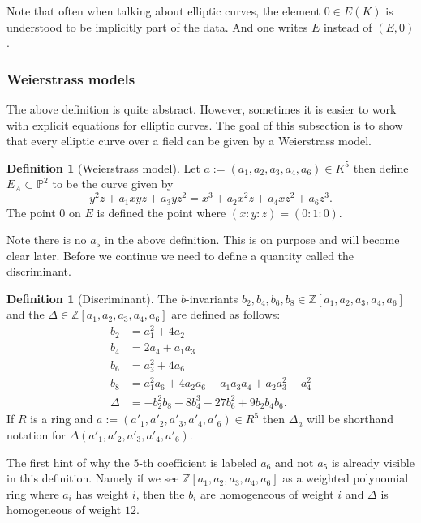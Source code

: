 \documentclass[a4paper,12pt,reqno]{amsart}
\newcommand{\field}[1]{\mathbb{#1}}  %
\newcommand{\Z}{\field{Z}} %
\renewcommand{\P}{\field{P}}
\theoremstyle{definition}
\newtheorem{definition}[lemma]{Definition}
\numberwithin{lemma}{section}
\numberwithin{equation}{section}
\numberwithin{figure}{section}
\begin{document}
Note that often when talking about elliptic curves, the element $0 \in E(K)$ is understood to be implicitly part of the data. And one writes $E$ instead of $(E,0)$.

\subsubsection{Weierstrass models}\label{sec:weierstrass-over-K}
The above definition is quite abstract. However, sometimes it is easier to work with explicit equations for elliptic curves. The goal of this subsection is to show that every elliptic curve over a field can be given by a Weierstrass model.

\begin{definition}[Weierstrass model]\label{def:weierstrass-model-over-K}
Let $a := (a_1,a_2,a_3,a_4,a_6) \in K^5$ then define $E_{A} \subset \P^2$ to be the curve given by
$$y^2z+ a_1xyz+a_3yz^2=x^3+a_2x^2z+a_4xz^2+a_6z^3.$$
The point $0$ on $E$ is defined the point where $(x:y:z) = (0:1:0)$.
\end{definition}



Note there is no $a_5$ in the above definition. This is on purpose and will become clear later.
Before we continue we need to define a quantity called the discriminant.
\begin{definition}[Discriminant]
The $b$-invariants $b_2,b_4,b_6,b_8 \in \Z[a_1,a_2,a_3,a_4,a_6]$ and the  $\Delta \in \Z[a_1,a_2,a_3,a_4,a_6]$ are defined as follows:
\begin{align*}
b_2 &= a_1^2 + 4 a_2 \\
b_4 &= 2a_4 + a_1 a_3 \\
b_6 &= a_3^2 + 4 a_6 \\
b_8 &= a_1^2 a_6 + 4a_2 a_6 - a_1 a_3 a_4 + a_2 a_3^2 - a_4^2 \\
\Delta &= -b_2^2 b_8 - 8b_4^3 - 27b_6^2 + 9b_2 b_4 b_6.
\end{align*}
If $R$ is a ring and $a := (a'_1,a'_2,a'_3,a'_4,a'_6) \in R^5$ then $\Delta_a$ will be shorthand notation for $\Delta(a'_1,a'_2,a'_3,a'_4,a'_6)$.
\end{definition}
The first hint of why the $5$-th coefficient is labeled $a_6$ and not $a_5$ is already visible in this definition. Namely if we see $\Z[a_1,a_2,a_3,a_4,a_6]$ as a weighted polynomial ring where $a_i$ has weight $i$, then the $b_i$ are homogeneous of weight $i$ and $\Delta$ is homogeneous of weight $12$.
\end{document}
